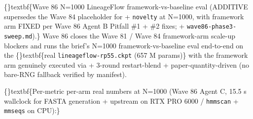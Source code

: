 \documentclass{article}
\begin{document}
\{\}textbf\{Wave 86 N=1000 LineageFlow framework-vs-baseline eval (ADDITIVE  supersedes the Wave 84 placeholder for  + \texttt{novelty} at N=1000, with framework arm FIXED per Wave 86 Agent B Pitfall \#1 + \#2 fixes;  + \texttt{wave86-phase3-sweep.md}).\} Wave 86 closes the Wave 81 / Wave 84 framework-arm scale-up blockers and runs the brief's N=1000 framework-vs-baseline eval end-to-end on the \{\}textbf\{real \texttt{lineageflow-rp55.ckpt} (657 M params)\} with the framework arm genuinely executed via  + 3-round restart-blend + paper-quantity-driven  (no bare-RNG fallback   verified by manifest).

\{\}textbf\{Per-metric per-arm real numbers at N=1000 (Wave 86 Agent C, 15.5 s wallclock for FASTA generation + upstream  on RTX PRO 6000 / \texttt{hmmscan} + \texttt{mmseqs} on CPU):\}
\end{document}
